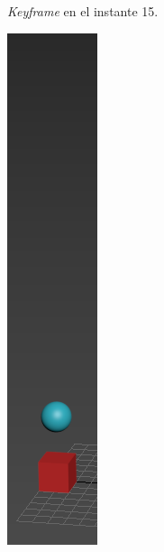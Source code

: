 \documentclass{article}
\begin{document}
\begin{figure}[H]
\begin{subfigure}[H]{0.15\textwidth}
	    \caption{\textit{Keyframe} en el instante 15.}
	\end{subfigure}
    \hfill
	\begin{subfigure}[H]{0.15\textwidth}
	    \centering
	    \includegraphics[width=\textwidth]{imagenes/p1_ins48.png}

\end{subfigure}
\end{figure}
\end{document}

